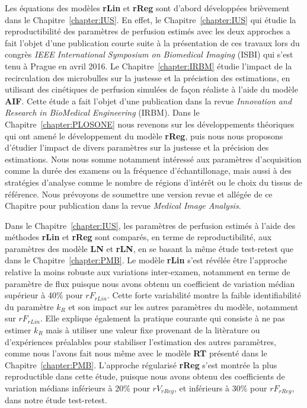 \begin{otherlanguage}{francais}
Les \'equations des mod\`eles \textbf{rLin} et \textbf{rReg} sont d'abord d\'evelopp\'ees bri\`evement dans le Chapitre~\ref{chapter:IUS}.
En effet, le Chapitre~\ref{chapter:IUS} qui \'etudie la reproductibilit\'e des param\`etres de perfusion estim\'es avec les deux approches a fait l'objet d'une publication courte suite \`a la pr\'esentation de ces travaux lors du congr\`es {\em IEEE International Symposium on Biomedical Imaging} (ISBI) qui s'est tenu \`a Prague en avril 2016.
Le Chapitre~\ref{chapter:IRBM} \'etudie l'impact de la recirculation des microbulles sur la justesse et la pr\'ecistion des estimations, en utilisant des cin\'etiques de perfusion simul\'ees de fa\c{c}on r\'ealiste  \`a l'aide du mod\`ele \textbf{AIF}.
Cette \'etude a fait l'objet d'une publication dans la revue {\em Innovation and Research in BioMedical Engineering} (IRBM).
Dans le Chapitre~\ref{chapter:PLOSONE} nous revenons sur les d\'eveloppements th\'eoriques qui ont amen\'e le d\'eveloppement du mod\`ele \textbf{rReg}, puis nous nous proposons d'\'etudier l'impact de divers param\`etres sur la justesse et la pr\'ecision des estimations.
Nous nous somme notamment int\'eress\'e aux param\`etres d'acquisition comme la dur\'ee des examens ou la fr\'equence d'\'echantillonage, mais aussi \`a des strat\'egies d'analyse comme le nombre de r\'egions d'int\'er\^et ou le choix du tissus de r\'ef\'erence.
Nous pr\'evoyons de soumettre une version revue et all\'eg\'ee de ce Chapitre pour publication dans la revue {\em Medical Image Analysis}.

Dans le Chapitre~\ref{chapter:IUS}, les param\`etres de perfusion estim\'es \`a l'aide des m\'ethodes \textbf{rLin} et \textbf{rReg} sont compar\'es, en terme de reproductibilit\'e, aux param\`etres des mod\`ele \textbf{LN} et \textbf{rLN}, en se basant la m\^eme \'etude test-retest que dans le Chapitre~\ref{chapter:PMB}.
Le mod\`ele \textbf{rLin} s'est r\'ev\'el\'ee \^etre l'approche relative la moins robuste aux variations inter-examen, notamment en terme de param\`etre de flux puisque nous avons obtenu un coefficient de variation m\'edian sup\'erieur \`a 40\% pour $rF_{rLin}$.
Cette forte variabilit\'e montre la faible identifiabilit\'e du param\`etre $k_R$ et son impact sur les autres param\`etres du mod\`ele, notamment sur $rF_{rLin}$.
Elle explique \'egalement la pratique courante qui consiste \`a ne pas estimer $k_R$ mais \`a utiliser une valeur fixe provenant de la lit\`erature ou d'exp\'eriences pr\'ealables pour stabiliser l'estimation des autres param\`etres, comme nous l'avons fait nous m\^eme avec le mod\`ele \textbf{RT} pr\'esent\'e dans le Chapitre~\ref{chapter:PMB}.
L'approche r\'egularis\'e \textbf{rReg} s'est montr\'ee la plus reproductible dans cette \'etude, puisque nous avons obtenu des coefficients de variation m\'edians inf\'erieurs \`a 20\% pour $rV_{rReg}$, et inf\'erieurs \`a 30\% pour $rF_{rReg}$, dans notre \'etude test-retest.


\end{otherlanguage}
